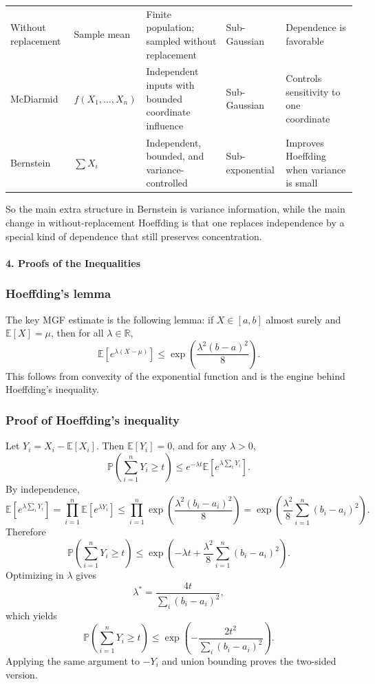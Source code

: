 \documentclass[11pt]{article}
\newcommand{\E}{\mathbb{E}}
\newcommand{\Pbb}{\mathbb{P}}
\newcommand{\R}{\mathbb{R}}
\begin{document}
\begin{solutionbox}
\begin{center}
\begin{tabularx}{0.96\linewidth}{@{}p{2.4cm} p{2.4cm} X p{1.9cm} X@{}}
Without replacement 
& Sample mean 
& Finite population; sampled without replacement 
& Sub-Gaussian 
& Dependence is favorable \\

McDiarmid 
& $f(X_1,\dots,X_n)$ 
& Independent inputs with bounded coordinate influence 
& Sub-Gaussian 
& Controls sensitivity to one coordinate \\

Bernstein 
& $\sum X_i$ 
& Independent, bounded, and variance-controlled 
& Sub-exponential 
& Improves Hoeffding when variance is small \\
\bottomrule
\end{tabularx}
\end{center}
\medskip

So the main extra structure in Bernstein is variance information, while the main change in without-replacement Hoeffding is that one replaces independence by a special kind of dependence that still preserves concentration.
 \medskip
\paragraph{4. Proofs of the Inequalities}
\subsubsection*{Hoeffding's lemma}
The key MGF estimate is the following lemma: if $X\in[a,b]$ almost surely and $\E[X]=\mu$, then for all $\lambda\in\R$,
\[
\E[e^{\lambda(X-\mu)}]
\le
\exp\!\left(\frac{\lambda^2(b-a)^2}{8}\right).
\]
This follows from convexity of the exponential function and is the engine behind Hoeffding's inequality.

\subsubsection*{Proof of Hoeffding's inequality}
Let $Y_i=X_i-\E[X_i]$. Then $\E[Y_i]=0$, and for any $\lambda>0$,
\[
\Pbb\left(\sum_{i=1}^n Y_i\ge t\right)
\le
 e^{-\lambda t}\E\left[e^{\lambda\sum_i Y_i}\right].
\]
By independence,
\[
\E\left[e^{\lambda\sum_i Y_i}\right]
=
\prod_{i=1}^n \E[e^{\lambda Y_i}]
\le
\prod_{i=1}^n \exp\!\left(\frac{\lambda^2(b_i-a_i)^2}{8}\right)
=
\exp\!\left(\frac{\lambda^2}{8}\sum_{i=1}^n (b_i-a_i)^2\right).
\]
Therefore
\[
\Pbb\left(\sum_{i=1}^n Y_i\ge t\right)
\le
\exp\!\left(-\lambda t + \frac{\lambda^2}{8}\sum_{i=1}^n (b_i-a_i)^2\right).
\]
Optimizing in $\lambda$ gives
\[
\lambda^* = \frac{4t}{\sum_i (b_i-a_i)^2},
\]
which yields
\[
\Pbb\left(\sum_{i=1}^n Y_i\ge t\right)
\le
\exp\!\left(-\frac{2t^2}{\sum_i (b_i-a_i)^2}\right).
\]
Applying the same argument to $-Y_i$ and union bounding proves the two-sided version.


\end{solutionbox}
\end{document}
